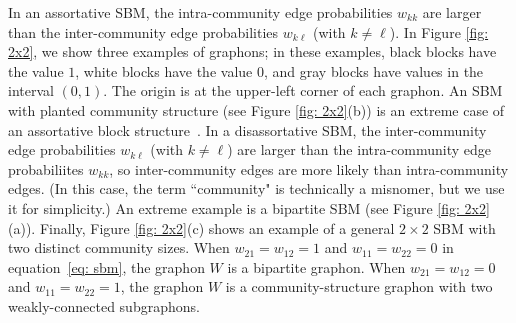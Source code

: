 \documentclass[11pt]{amsart}
\numberwithin{equation}{section}
\begin{document}
In an assortative SBM, the intra-community edge probabilities $w_{kk}$ are larger than the inter-community edge probabilities $w_{k \ell}$ (with $k \neq \ell$).
In Figure \ref{fig: 2x2}, we show three examples of graphons; in these examples, black blocks have the value $1$, white blocks have the value {$0$}, and gray blocks have values in the interval $(0,1)$. The origin is at the upper-left corner of each graphon. An SBM with planted community structure (see Figure \ref{fig: 2x2}(b)) is an extreme case of {an} assortative block structure~\cite{peixoto2019}. In a disassortative SBM, the inter-community edge probabilities $w_{k \ell}$ (with $k \neq \ell$) are larger than the intra-community edge probabiliites $w_{kk}$, so inter-community edges are more likely than intra-community edges. (In this case, the term ``community" is technically a misnomer, but we use it for simplicity.)
An extreme example is a bipartite SBM (see Figure \ref{fig: 2x2}(a)). 
Finally, Figure \ref{fig: 2x2}(c) shows an example of a general $2 \times 2$ SBM with two distinct community sizes. When {$w_{21} = w_{12} = 1$ and $w_{11} = w_{22} = 0$} in equation~\eqref{eq: sbm}, the graphon $W$ is a  bipartite graphon. When 
{$w_{21} = w_{12} = 0$ and $w_{11} = w_{22} = 1$}, the graphon $W$ is a community-structure graphon with two weakly-connected subgraphons. 
\end{document}

